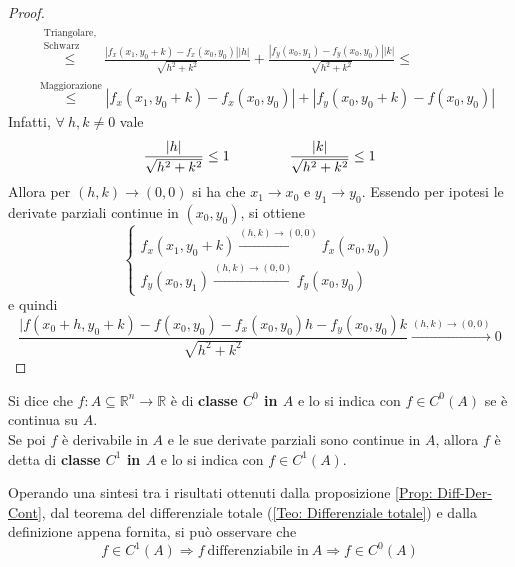 \begin{proof}
\begin{equation*}
\begin{aligned}
                &\overset{\substack{\text{Triangolare,}\\\text{Schwarz}}}{\leq} \frac{|f_x(x_1, y_0+k)-f_x(x_0, y_0)||h|}{\sqrt{h^2+k^2}}+\frac{|f_y(x_0, y_1)-f_y(x_0, y_0)||k|}{\sqrt{h^2+k^2}}\leq\\
                &\overset{\text{Maggiorazione}}{\leq} |f_x(x_1, y_0+k)-f_x(x_0, y_0)|+|f_y(x_0, y_0+k)-f(x_0, y_0)|
            \end{aligned}
        \end{equation*}
        Infatti, $\forall\ h,k \neq 0$ vale
        \begin{equation*}
            \frac{|h|}{\sqrt{h^2+k^2}}\leq 1 \hspace{1.5 cm} \frac{|k|}{\sqrt{h^2+k^2}}\leq 1
        \end{equation*}
        Allora per $(h,k) \to (0,0)$ si ha che $x_1 \to x_0$ e $y_1 \to y_0$. Essendo per ipotesi le derivate parziali continue in $(x_0, y_0)$, si ottiene
        \begin{equation*}
            \begin{cases}
                f_x(x_1, y_0+k) \xrightarrow{(h, k) \to (0,0)} f_x(x_0, y_0)\\
                f_y(x_0, y_1) \xrightarrow{(h, k) \to (0,0)} f_y(x_0, y_0)
            \end{cases}
        \end{equation*} 
        e quindi 
        \begin{equation*}
            \frac{|f(x_0+h, y_0+k)-f(x_0, y_0)-f_x(x_0, y_0)h-f_y(x_0, y_0)k}{\sqrt{h^2+k^2}} \xrightarrow{(h,k)\to(0,0)} 0
        \end{equation*}
    \end{proof}
\begin{definition} \label{Def:C0 e C1}
    Si dice che $f:A \subseteq \mathbb{R}^n\to \mathbb{R}$ è di \textbf{classe $C^0$ in $A$} e lo si indica con $f \in C^0(A)$ se è continua su $A$.\\
    Se poi $f$ è derivabile in $A$ e le sue derivate parziali sono continue in $A$, allora $f$ è detta di \textbf{classe $C^1$ in $A$} e lo si indica con $f \in C^1(A)$.
\end{definition}
    \begin{oss}
        Operando una sintesi tra i risultati ottenuti dalla proposizione \ref{Prop: Diff-Der-Cont}, dal teorema del differenziale totale (\ref{Teo: Differenziale totale}) e dalla definizione appena fornita, si può osservare che
        \begin{equation} \label{Eq: Relazione C^1 -> diff -> C^0}
            f \in C^1(A) \Rightarrow f\ \text{differenziabile in}\ A \Rightarrow f \in C^{0}(A)
        \end{equation}
    \end{oss} 
